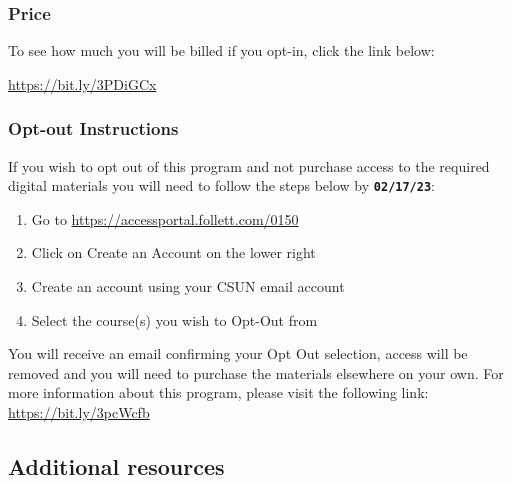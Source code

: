 \documentclass[
  letterpaper,
  DIV=11,
  numbers=noendperiod]{scrartcl}
\providecommand{\tightlist}{%
  \setlength{\itemsep}{0pt}\setlength{\parskip}{0pt}}\usepackage{longtable,booktabs,array}
\begin{document}
\hypertarget{price}{%
\subsubsection{Price}\label{price}}

To see how much you will be billed if you opt-in, click the link below:

\url{https://bit.ly/3PDiGCx}

\hypertarget{opt-out-instructions}{%
\subsubsection{Opt-out Instructions}\label{opt-out-instructions}}

If you wish to opt out of this program and not purchase access to the
required digital materials you will need to follow the steps below by
\textbf{\texttt{02/17/23}}:

\begin{enumerate}
\def\labelenumi{\arabic{enumi}.}
\tightlist
\item
  Go to \url{https://accessportal.follett.com/0150}
\item
  Click on Create an Account on the lower right
\item
  Create an account using your CSUN email account
\item
  Select the course(s) you wish to Opt-Out from
\end{enumerate}

\begin{tcolorbox}[enhanced jigsaw, leftrule=.75mm, breakable, opacityback=0, bottomrule=.15mm, rightrule=.15mm, colbacktitle=quarto-callout-note-color!10!white, colframe=quarto-callout-note-color-frame, arc=.35mm, bottomtitle=1mm, left=2mm, title=\textcolor{quarto-callout-note-color}{\faInfo}\hspace{0.5em}{Note}, titlerule=0mm, toptitle=1mm, toprule=.15mm, opacitybacktitle=0.6, colback=white, coltitle=black]

You will receive an email confirming your Opt Out selection, access will
be removed and you will need to purchase the materials elsewhere on your
own. For more information about this program, please visit the following
link: \url{https://bit.ly/3pcWcfb}

\end{tcolorbox}

\hypertarget{additional-resources}{%
\subsection{Additional resources}\label{additional-resources}}
\end{document}
